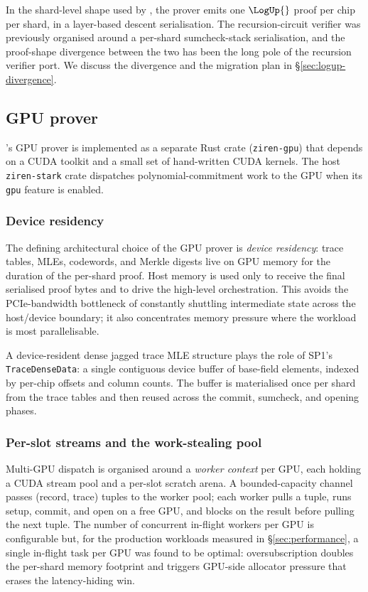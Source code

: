 In the shard-level shape used by \Zirenver{}, the prover emits one $\LogUp{}$ proof per chip per shard, in a layer-based descent serialisation. The recursion-circuit verifier was previously organised around a per-shard sumcheck-stack serialisation, and the proof-shape divergence between the two has been the long pole of the recursion verifier port. We discuss the divergence and the migration plan in \S\ref{sec:logup-divergence}.

\subsection{GPU prover}
\label{sec:gpu-prover}

\Zirenver{}'s GPU prover is implemented as a separate Rust crate (\texttt{ziren-gpu}) that depends on a CUDA toolkit and a small set of hand-written CUDA kernels. The host \texttt{ziren-stark} crate dispatches polynomial-commitment work to the GPU when its \texttt{gpu} feature is enabled.

\subsubsection{Device residency}

The defining architectural choice of the GPU prover is \emph{device residency}: trace tables, MLEs, codewords, and Merkle digests live on GPU memory for the duration of the per-shard proof. Host memory is used only to receive the final serialised proof bytes and to drive the high-level orchestration. This avoids the PCIe-bandwidth bottleneck of constantly shuttling intermediate state across the host/device boundary; it also concentrates memory pressure where the workload is most parallelisable.

A device-resident dense jagged trace MLE structure plays the role of SP1's \texttt{TraceDenseData}: a single contiguous device buffer of base-field elements, indexed by per-chip offsets and column counts. The buffer is materialised once per shard from the trace tables and then reused across the commit, sumcheck, and opening phases.

\subsubsection{Per-slot streams and the work-stealing pool}

Multi-GPU dispatch is organised around a \emph{worker context} per GPU, each holding a CUDA stream pool and a per-slot scratch arena. A bounded-capacity channel passes (record, trace) tuples to the worker pool; each worker pulls a tuple, runs setup, commit, and open on a free GPU, and blocks on the result before pulling the next tuple. The number of concurrent in-flight workers per GPU is configurable but, for the production workloads measured in \S\ref{sec:performance}, a single in-flight task per GPU was found to be optimal: oversubscription doubles the per-shard memory footprint and triggers GPU-side allocator pressure that erases the latency-hiding win.

